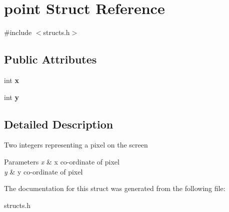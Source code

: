 \hypertarget{structpoint}{}\section{point Struct Reference}
\label{structpoint}


{\ttfamily \#include $<$structs.\+h$>$}

\subsection*{Public Attributes}
\begin{DoxyCompactItemize}
\item 
\mbox{\label{structpoint_ad679b07fb69d55f5ad454d0f1f2891d5}} 
int {\bfseries x}
\item 
\mbox{\label{structpoint_a9a82ca9504acabb1e30569f89c805471}} 
int {\bfseries y}
\end{DoxyCompactItemize}


\subsection{Detailed Description}
Two integers representing a pixel on the screen 
\begin{DoxyParams}{Parameters}
{\em x} & x co-\/ordinate of pixel \\
\hline
{\em y} & y co-\/ordinate of pixel \\
\hline
\end{DoxyParams}


The documentation for this struct was generated from the following file\+:\begin{DoxyCompactItemize}
\item 
structs.\+h\end{DoxyCompactItemize}
